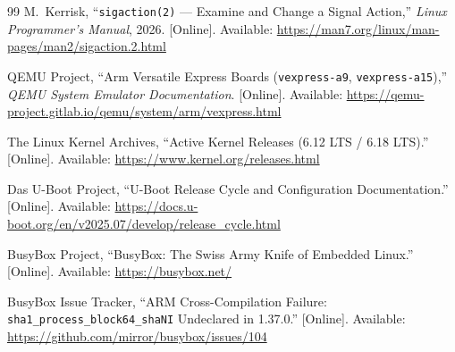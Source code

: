 \documentclass[11pt,a4paper]{article}
\begin{document}
\begin{thebibliography}{99}
M.~Kerrisk, ``\texttt{sigaction(2)} --- Examine and Change a Signal Action,'' \emph{Linux Programmer's Manual}, 2026. [Online]. Available: \url{https://man7.org/linux/man-pages/man2/sigaction.2.html}

QEMU Project, ``Arm Versatile Express Boards (\texttt{vexpress-a9}, \texttt{vexpress-a15}),'' \emph{QEMU System Emulator Documentation}. [Online]. Available: \url{https://qemu-project.gitlab.io/qemu/system/arm/vexpress.html}

The Linux Kernel Archives, ``Active Kernel Releases (6.12 LTS / 6.18 LTS).'' [Online]. Available: \url{https://www.kernel.org/releases.html}

Das U-Boot Project, ``U-Boot Release Cycle and Configuration Documentation.'' [Online]. Available: \url{https://docs.u-boot.org/en/v2025.07/develop/release_cycle.html}

BusyBox Project, ``BusyBox: The Swiss Army Knife of Embedded Linux.'' [Online]. Available: \url{https://busybox.net/}

BusyBox Issue Tracker, ``ARM Cross-Compilation Failure: \texttt{sha1\_process\_block64\_shaNI} Undeclared in 1.37.0.'' [Online]. Available: \url{https://github.com/mirror/busybox/issues/104}

\end{thebibliography}
\end{document}
